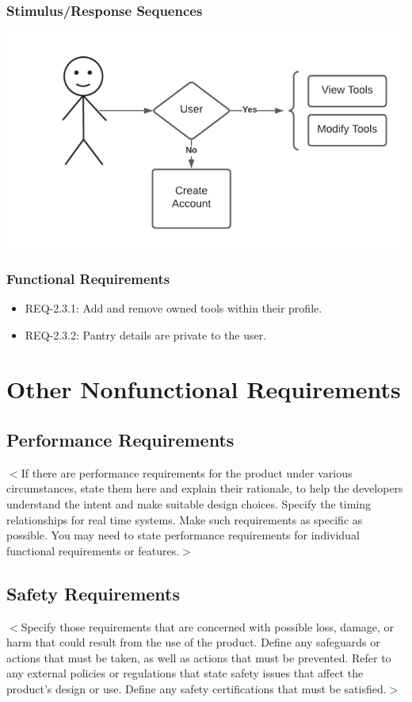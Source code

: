 \documentclass{scrreprt}
\begin{document}
\subsection{Stimulus/Response Sequences}

\includegraphics{FlowCharts/Profile-Tools.png}

\subsection{Functional Requirements}

\begin{itemize}
    \item REQ-2.3.1: Add and remove owned tools within their profile.
    \item REQ-2.3.2: Pantry details are private to the user.
\end{itemize}

\chapter{Other Nonfunctional Requirements}

\section{Performance Requirements}
$<$If there are performance requirements for the product under various 
circumstances, state them here and explain their rationale, to help the 
developers understand the intent and make suitable design choices. Specify the 
timing relationships for real time systems. Make such requirements as specific 
as possible. You may need to state performance requirements for individual 
functional requirements or features.$>$

\section{Safety Requirements}
$<$Specify those requirements that are concerned with possible loss, damage, or 
harm that could result from the use of the product. Define any safeguards or 
actions that must be taken, as well as actions that must be prevented. Refer to 
any external policies or regulations that state safety issues that affect the 
product’s design or use. Define any safety certifications that must be 
satisfied.$>$
\end{document}
